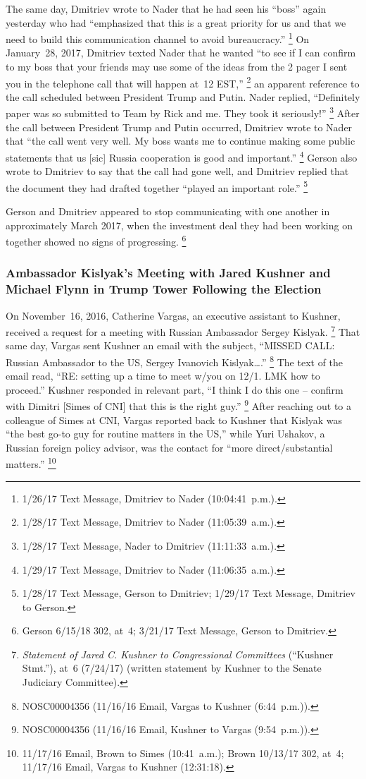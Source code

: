 The same day, Dmitriev wrote to Nader that he had seen his ``boss'' again yesterday who had ``emphasized that this is a great priority for us and that we need to build this communication channel to avoid bureaucracy.''%
\footnote{1/26/17 Text Message, Dmitriev to Nader (10:04:41~p.m.).}
On January~28, 2017, Dmitriev texted Nader that he wanted ``to see if I can confirm to my boss that your friends may use some of the ideas from the 2 pager I sent you in the telephone call that will happen at~12 EST,''%
\footnote{1/28/17 Text Message, Dmitriev to Nader (11:05:39~a.m.).}
an apparent reference to the call scheduled between President Trump and Putin.
Nader replied, ``Definitely paper was so submitted to Team by Rick and me.
They took it seriously!''%
\footnote{1/28/17 Text Message, Nader to Dmitriev (11:11:33~a.m.).}
After the call between President Trump and Putin occurred, Dmitriev wrote to Nader that ``the call went very well.
My boss wants me to continue making some public statements that us [sic] Russia cooperation is good and important.''%
\footnote{1/29/17 Text Message, Dmitriev to Nader (11:06:35~a.m.).}
Gerson also wrote to Dmitriev to say that the call had gone well, and Dmitriev replied that the document they had drafted together ``played an important role.''%
\footnote{1/28/17 Text Message, Gerson to Dmitriev;
1/29/17 Text Message, Dmitriev to Gerson.}

Gerson and Dmitriev appeared to stop communicating with one another in approximately March 2017, when the investment deal they had been working on together showed no signs of progressing.%
\footnote{Gerson 6/15/18 302, at~4;
3/21/17 Text Message, Gerson to Dmitriev.}

\subsubsection{Ambassador Kislyak's Meeting with Jared Kushner and Michael Flynn in Trump Tower Following the Election}

On November~16, 2016, Catherine Vargas, an executive assistant to Kushner, received a request for a meeting with Russian Ambassador Sergey Kislyak.%
\footnote{\textit{Statement of Jared C. Kushner to Congressional Committees} (``Kushner Stmt.''), at~6 (7/24/17) (written statement by Kushner to the Senate Judiciary Committee).}
That same day, Vargas sent Kushner an email with the subject, ``MISSED CALL: Russian Ambassador to the US, Sergey Ivanovich Kislyak\dots.''%
\footnote{NOSC00004356 (11/16/16 Email, Vargas to Kushner (6:44~p.m.)).}
The text of the email read, ``RE: setting up a time to meet w/you on 12/1. LMK how to proceed.''
Kushner responded in relevant part, ``I think I do this one -- confirm with Dimitri [Simes of CNI] that this is the right guy.''%
\footnote{NOSC00004356 (11/16/16 Email, Kushner to Vargas (9:54~p.m.)).}
After reaching out to a colleague of Simes at CNI, Vargas reported back to Kushner that Kislyak was ``the best go-to guy for routine matters in the US,'' while Yuri Ushakov, a Russian foreign policy advisor, was the contact for ``more direct/substantial matters.''%
\footnote{11/17/16 Email, Brown to Simes (10:41~a.m.);
Brown 10/13/17 302, at~4;
11/17/16 Email, Vargas to Kushner (12:31:18).}

